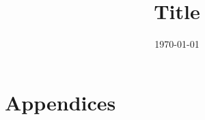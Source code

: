 \documentclass[onehalfspace]{ReportChapters}
\title{Title}				%
\date{\today}				%
\begin{document}
\begin{singlespace}


\tableofcontents
\end{singlespace}





\pagebreak



\pagebreak
\section*{Appendices}

\begin{appendices}



\end{appendices}
\end{document}
